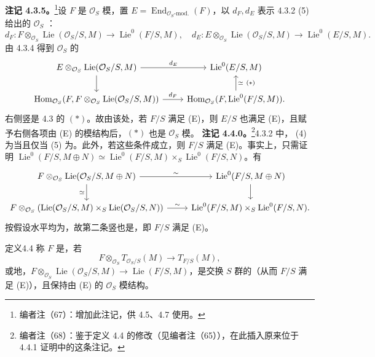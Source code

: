 \textbf{注记 4.3.5。}\footnote{编者注（67）：增加此注记，供 4.5、4.7 使用。}设 $F$ 是 $\mathcal O_S$ 模，置 $E=\operatorname{End}_{\mathcal O_S\text{-mod.}}(F)$，以 $d_F,d_E$ 表示 4.3.2 (5) 给出的 $\mathcal O_S$ ：
\[d_F:F\otimes_{\mathcal O_S}\operatorname{Lie}(\mathcal O_S/S,M)\to\operatorname{Lie}^0(F/S,M),\quad d_E:E\otimes_{\mathcal O_S}\operatorname{Lie}(\mathcal O_S/S,M)\to\operatorname{Lie}^0(E/S,M).\]
由 4.3.4 得到 $\mathcal O_S$ 的
\[\begin{tikzcd}
E\otimes_{\mathcal O_S}\operatorname{Lie}(\mathcal O_S/S,M)\arrow[r,"d_E"]\arrow[d]&\operatorname{Lie}^0(E/S,M)\\
\operatorname{Hom}_{\mathcal O_S}(F,F\otimes_{\mathcal O_S}\operatorname{Lie}(\mathcal O_S/S,M))\arrow[r,"d_F"]&\operatorname{Hom}_{\mathcal O_S}(F,\operatorname{Lie}^0(F/S,M))\arrow[u,"\simeq\ (*)"'].
\end{tikzcd}\]
右侧竖是 4.3 的 $(*)$。故由该处，若 $F/S$ 满足 (E)，则 $E/S$ 也满足 (E)，且赋予右侧各项由 (E) 的模结构后，$(*)$ 也是 $\mathcal O_S$ 模。
\textbf{注记 4.4.0。}\footnote{编者注（68）：鉴于定义 4.4 的修改（见编者注（65）），在此插入原来位于 4.4.1 证明中的这条注记。}4.3.2 中， (4) 为当且仅当 (5) 为。此外，若这些条件成立，则 $F/S$ 满足 (E)。事实上，只需证明 $\operatorname{Lie}^0(F/S,M\oplus N)\simeq\operatorname{Lie}^0(F/S,M)\times_S\operatorname{Lie}^0(F/S,N)$。有
\[\begin{tikzcd}
F\otimes_{\mathcal O_S}\operatorname{Lie}(\mathcal O_S/S,M\oplus N)\arrow[r,"\sim"]\arrow[d,"\simeq"']&\operatorname{Lie}^0(F/S,M\oplus N)\arrow[d]\\
F\otimes_{\mathcal O_S}(\operatorname{Lie}(\mathcal O_S/S,M)\times_S\operatorname{Lie}(\mathcal O_S/S,N))\arrow[r,"\sim"]&\operatorname{Lie}^0(F/S,M)\times_S\operatorname{Lie}^0(F/S,N).
\end{tikzcd}\]
按假设水平均为，故第二条竖也是，即 $F/S$ 满足 (E)。
\begin{SGAresult}{定义}{4.4}
称 $F$ 是，若
\[F\otimes_{\mathcal O_S}T_{\mathcal O_S/S}(M)\to T_{F/S}(M),\]
或地，$F\otimes_{\mathcal O_S}\operatorname{Lie}(\mathcal O_S/S,M)\to\operatorname{Lie}(F/S,M)$，是交换 $S$ 群的（从而 $F/S$ 满足 (E)），且保持由 (E) 的 $\mathcal O_S$ 模结构。
\end{SGAresult}
